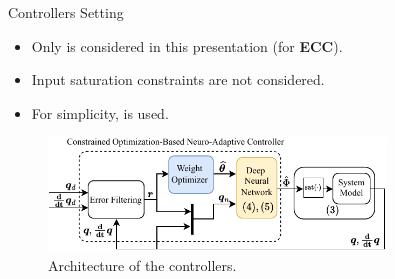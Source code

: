 \documentclass[8pt, aspectratio=169]{beamer}
\newcommand{\ctxt}[2]{\color{#1}{#2}\color{black}}
\begin{document}
\begin{frame}{\insertsubsectionhead}{Controllers Setting}
  
  \begin{itemize}
    \item Only \ctxt{awesome}{weight norm constraint } is considered in this presentation (for \textbf{ECC}).
    \item Input saturation constraints are not considered.
    \item For simplicity, \ctxt{airforceblue}{single hidden layer NN} is used.
  \end{itemize}

  \centering
  \begin{figure}
    \includegraphics[width=0.8\textwidth]{figures/Controller.drawio.pdf}
    \caption{Architecture of the controllers.}
  \end{figure}

\end{frame}

\end{document}
